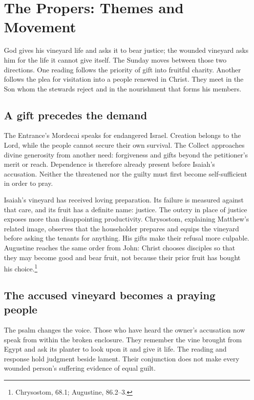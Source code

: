 \clearpage
\section{The Propers: Themes and Movement}
God gives his vineyard life and asks it to bear justice; the wounded vineyard asks him for the life it cannot give itself. The Sunday moves between those two directions. One reading follows the priority of gift into fruitful charity. Another follows the plea for visitation into a people renewed in Christ. They meet in the Son whom the stewards reject and in the nourishment that forms his members.

\subsection{A gift precedes the demand}
The Entrance's Mordecai speaks for endangered Israel. Creation belongs to the Lord, while the people cannot secure their own survival. The Collect approaches divine generosity from another need: forgiveness and gifts beyond the petitioner's merit or reach. Dependence is therefore already present before Isaiah's accusation. Neither the threatened nor the guilty must first become self-sufficient in order to pray.

Isaiah's vineyard has received loving preparation. Its failure is measured against that care, and its fruit has a definite name: justice. The outcry in place of justice exposes more than disappointing productivity. Chrysostom, explaining Matthew's related image, observes that the householder prepares and equips the vineyard before asking the tenants for anything. His gifts make their refusal more culpable. Augustine reaches the same order from John: Christ chooses disciples so that they may become good and bear fruit, not because their prior fruit has bought his choice.\footnote{Chrysostom,  68.1; Augustine,  86.2--3.}

\subsection{The accused vineyard becomes a praying people}
The psalm changes the voice. Those who have heard the owner's accusation now speak from within the broken enclosure. They remember the vine brought from Egypt and ask its planter to look upon it and give it life. The reading and response hold judgment beside lament. Their conjunction does not make every wounded person's suffering evidence of equal guilt.


